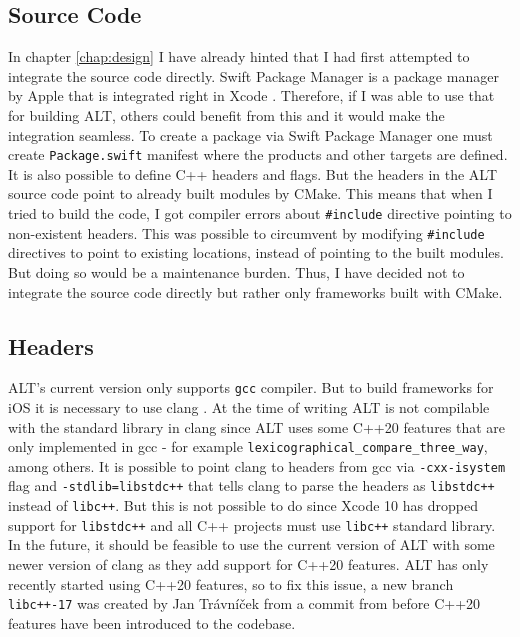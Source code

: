 \subsection{Source Code}
In chapter \ref{chap:design} I have already hinted that I had first attempted to integrate the source code directly. Swift Package Manager is a package manager by Apple that is integrated right in Xcode \cite{spm}. Therefore, if I was able to use that for building ALT, others could benefit from this and it would make the integration seamless. To create a package via Swift Package Manager one must create \lstinline{Package.swift} manifest where the products and other targets are defined. It is also possible to define C++ headers and flags. But the headers in the ALT source code point to already built modules by CMake. This means that when I tried to build the code, I got compiler errors about \lstinline{#include} directive pointing to non-existent headers. This was possible to circumvent by modifying \lstinline{#include} directives to point to existing locations, instead of pointing to the built modules. But doing so would be a maintenance burden. Thus, I have decided not to integrate the source code directly but rather only frameworks built with CMake.

\subsection{Headers}
ALT's current version only supports \lstinline{gcc} compiler. But to build frameworks for iOS it is necessary to use clang \cite{clang}. At the time of writing ALT is not compilable with the standard library in clang since ALT uses some C++20 features that are only implemented in gcc - for example \lstinline{lexicographical_compare_three_way}, among others. It is possible to point clang to headers from gcc via \lstinline{-cxx-isystem} flag and \lstinline{-stdlib=libstdc++} that tells clang to parse the headers as \lstinline{libstdc++} instead of \lstinline{libc++}. But this is not possible to do since Xcode 10 has dropped support for \lstinline{libstdc++} and all C++ projects must use \lstinline{libc++} standard library. In the future, it should be feasible to use the current version of ALT with some newer version of clang as they add support for C++20 features. ALT has only recently started using C++20 features, so to fix this issue, a new branch \lstinline{libc++-17} was created by Jan Trávníček from a commit from before C++20 features have been introduced to the codebase.

